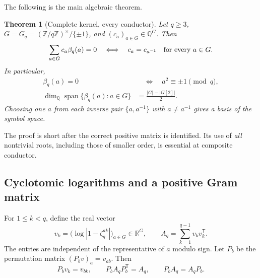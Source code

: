 \documentclass[11pt]{article}
\numberwithin{equation}{section}
\newtheorem{theorem}{Theorem}[section]
\theoremstyle{definition}
\theoremstyle{remark}
\newcommand{\Q}{\mathbb Q}
\newcommand{\R}{\mathbb R}
\newcommand{\Z}{\mathbb Z}
\DeclareMathOperator{\Span}{span}
\begin{document}
The following is the main algebraic theorem.

\begin{theorem}[Complete kernel, every conductor]\label{thm:kernel}
Let $q\ge3$, $G=G_q=(\Z/q\Z)^\times/\{\pm1\}$, and
$(c_a)_{a\in G}\in\Q^G$. Then
\begin{equation}\label{eq:kernel}
 \sum_{a\in G}c_a\beta_q(a)=0
 \quad\Longleftrightarrow\quad
 c_a=c_{a^{-1}}\quad\hbox{for every }a\in G.
\end{equation}
In particular,
\begin{align}
 \beta_q(a)=0&\quad\Longleftrightarrow\quad a^2\equiv\pm1\pmod q,
 \label{eq:zero-beta}\\
 \dim_\Q\Span\{\beta_q(a):a\in G\}
 &=\frac{|G|-|G[2]|}{2}.
 \label{eq:rank-beta}
\end{align}
Choosing one $a$ from each inverse pair $\{a,a^{-1}\}$ with
$a\ne a^{-1}$ gives a basis of the symbol space.
\end{theorem}

The proof is short after the correct positive matrix is identified.
Its use of \emph{all} nontrivial roots, including those of smaller order,
is essential at composite conductor.

\subsection{Cyclotomic logarithms and a positive Gram matrix}

For $1\le k<q$, define the real vector
\begin{equation}\label{eq:vk}
 v_k=\bigl(\log|1-\zeta_q^{ak}|\bigr)_{a\in G}\in\R^G,
 \qquad A_q=\sum_{k=1}^{q-1}v_kv_k^{\mathsf T}.
\end{equation}
The entries are independent of the representative of $a$ modulo sign.
Let $P_b$ be the permutation matrix
$(P_bv)_a=v_{ab}$. Then
\begin{equation}\label{eq:Gram-equiv}
 P_bv_k=v_{bk},\qquad P_bA_qP_b^{\mathsf T}=A_q,
 \qquad P_bA_q=A_qP_b.
\end{equation}
\end{document}
